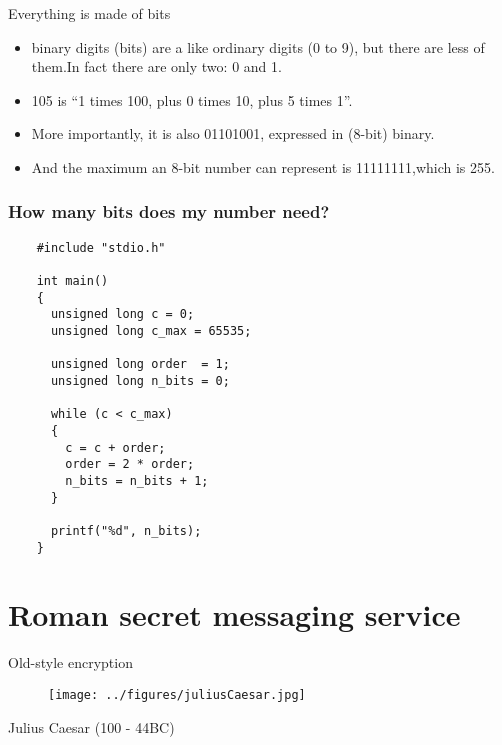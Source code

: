 \documentclass[xcolor=dvipsnames]{beamer}
\begin{document}
\begin{frame}{Everything is made of bits}
  \begin{itemize}
  \item binary digits (bits) are a like ordinary digits ({\color{red}0} to {\color{red}9}), but there are less of them.\newline In fact there are only {\color{blue}two}: {\color{red}0} and {\color{red}1}.\pause \vspace{5mm}
  \item {\color{red}105} is ``{\color{red}1} times {\color{blue}100}, plus {\color{red}0} times {\color{blue}10}, plus {\color{red}5} times {\color{blue}1}''.\pause \vspace{5mm}
  \item More importantly, it is also 01101001, expressed in (8-bit) binary.\pause \vspace{5mm}
  \item And the maximum an 8-bit number can represent is 11111111,\newline which is 255.
  \end{itemize}
\end{frame}


\begin{frame}[fragile]
  \frametitle{How many bits does my number need?}
  \begin{lstlisting}
    #include "stdio.h"

    int main()
    {
      unsigned long c = 0;
      unsigned long c_max = 65535;

      unsigned long order  = 1;
      unsigned long n_bits = 0;

      while (c < c_max)
      {
        c = c + order;
        order = 2 * order;
        n_bits = n_bits + 1;
      }

      printf("%d", n_bits);
    }
  \end{lstlisting}
\end{frame}


\section{Roman secret messaging service}


\begin{frame}{Old-style encryption}
  \begin{figure}
    \centering
    \texttt{[image: ../figures/juliusCaesar.jpg]}
  \end{figure}
  \begin{center}
    Julius Caesar (100 - 44BC)
  \end{center}
\end{frame}
\end{document}
